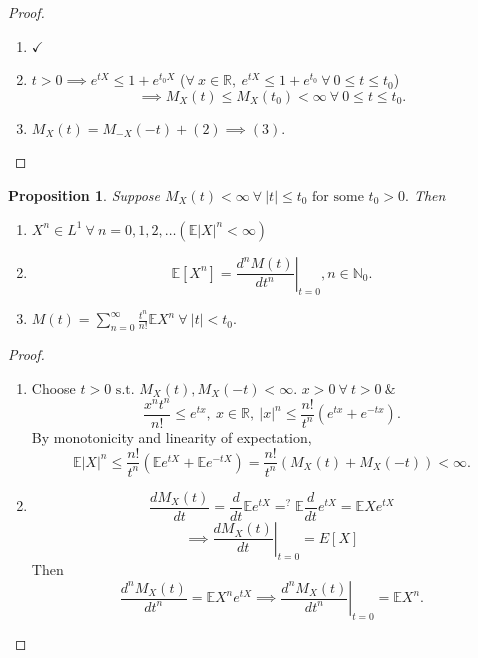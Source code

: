 \documentclass{article}
\newcommand{\1}{\mathds{1}}
\newcommand{\R}{\mathbb{R}}
\newcommand{\E}{\mathbb{E}}
\newcommand{\N}{\mathbb{N}}
\newcommand{\lf}{\left}
\newcommand{\rg}{\right}
\newcommand{\f}[2]{\frac{#1}{#2}}
\newcommand{\st}{\text{ s.t. }}
\newcommand{\card}[1]{\lf\vert #1\rg\vert}
\newcommand{\ar}{\ \&\ }
\newtheorem{proposition}[theorem]{Proposition}
\begin{document}
\begin{proof}
    \begin{enumerate}
        \item $\checkmark$
        \item $t>0\implies e^{tX}\leq 1+e^{t_0X}$ ($\forall\ x\in\R,\ e^{tX}\leq 1+e^{t_0}\ \forall\ 0\leq t\leq t_0$) $$\implies M_X(t)\leq M_X(t_0)<\infty\ \forall\ 0\leq t\leq t_0.$$
        \item $M_X(t)=M_{-X}(-t)+(2)\implies (3).$
    \end{enumerate}
\end{proof}
\begin{proposition}
    Suppose $M_X(t)<\infty\ \forall\ \card t\leq t_0\text{ for some }t_0>0.$ Then \begin{enumerate}
        \item $X^n\in L^1\ \forall\ n=0,1,2,\ldots(\E\card X^n<\infty)$
        \item $$\E[X^n]=\lf.\f{d^n M(t)}{d t^n}\rg\vert_{t=0},n\in \N_0.$$
        \item $M(t)=\sum_{n=0}^\infty \f{t^n}{n!}\E X^n\ \forall\ \card t<t_0.$
    \end{enumerate}
\end{proposition}
\begin{proof}
    \begin{enumerate}
        \item Choose $t>0\st M_X(t),M_X(-t)<\infty.$ $x>0\ \forall\ t>0\ar$ $$\f{x^nt^n}{n!}\leq e^{tx},\ x\in\R,\ \card{x}^n\leq \f{n!}{t^n}(e^{tx}+e^{-tx}).$$
        By monotonicity and linearity of expectation, $$\E\card X^n\leq \f{n!}{t^n}(\E e^{tX}+\E e^{-tX})=\f{n!}{t^n}(M_X(t)+M_X(-t))<\infty.$$
        \item $$\f{dM_X(t)}{dt}=\f{d}{dt}\E e^{tX}=^?\E\f{d}{dt}e^{tX}=\E Xe^{tX}$$ $$\implies \lf.\f{dM_X(t)}{dt}\rg\vert_{t=0}=E [X]$$
        Then $$\f{d^n M_X(t)}{dt^n}=\E X^ne^{tX}\implies \lf.\f{d^n M_X(t)}{dt^n}\rg\vert_{t=0}=\E X^n.$$
    \end{enumerate}
\end{proof}
\end{document}
